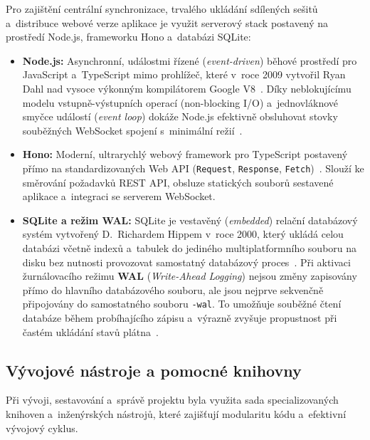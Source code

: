 \documentclass[12pt, a4paper, oneside]{article}
\begin{document}
Pro zajištění centrální synchronizace, trvalého ukládání sdílených sešitů a~distribuce webové verze aplikace je využit serverový stack postavený na prostředí Node.js, frameworku Hono a~databázi SQLite:
\begin{itemize}
    \item \textbf{Node.js:} Asynchronní, událostmi řízené (\textit{event-driven}) běhové prostředí pro JavaScript a~TypeScript mimo prohlížeč, které v~roce 2009 vytvořil Ryan Dahl nad vysoce výkonným kompilátorem Google V8~\cite{nodejs_docs}. Díky neblokujícímu modelu vstupně-výstupních operací (non-blocking I/O) a~jednovláknové smyčce událostí (\textit{event loop}) dokáže Node.js efektivně obsluhovat stovky souběžných WebSocket spojení s~minimální režií~\cite{nodejs_docs}.
    \item \textbf{Hono:} Moderní, ultrarychlý webový framework pro TypeScript postavený přímo na standardizovaných Web API (\texttt{Request}, \texttt{Response}, \texttt{Fetch})~\cite{hono_docs}. Slouží ke směrování požadavků REST API, obsluze statických souborů sestavené aplikace a~integraci se serverem WebSocket.
    \item \textbf{SQLite a režim WAL:} SQLite je vestavěný (\textit{embedded}) relační databázový systém vytvořený D.~Richardem Hippem v~roce 2000, který ukládá celou databázi včetně indexů a~tabulek do jediného multiplatformního souboru na disku bez nutnosti provozovat samostatný databázový proces~\cite{sqlite_wal}. Při aktivaci žurnálovacího režimu \textbf{WAL} (\textit{Write-Ahead Logging}) nejsou změny zapisovány přímo do hlavního databázového souboru, ale jsou nejprve sekvenčně připojovány do samostatného souboru \texttt{-wal}. To umožňuje souběžné čtení databáze během probíhajícího zápisu a~výrazně zvyšuje propustnost při častém ukládání stavů plátna~\cite{sqlite_wal}.
\end{itemize}


\subsection{Vývojové nástroje a pomocné knihovny}
\label{sec:teorie_nastroje}

Při vývoji, sestavování a~správě projektu byla využita sada specializovaných knihoven a~inženýrských nástrojů, které zajišťují modularitu kódu a~efektivní vývojový cyklus.
\end{document}
